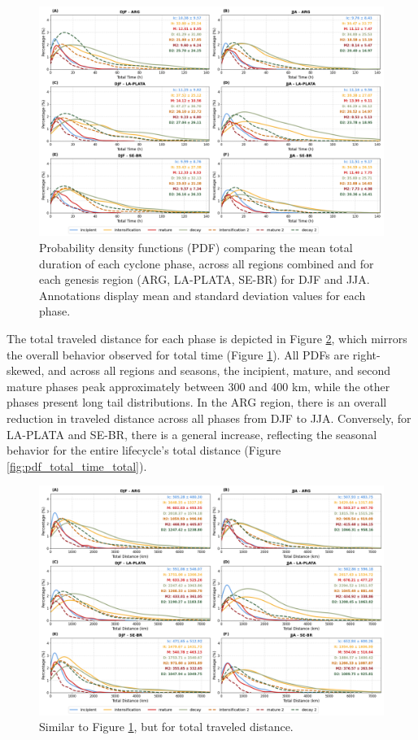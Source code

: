 \begin{figure}[h!]
\centering
\includegraphics[width=\textwidth]{figs_4/pdf_total_time.png}
\caption[PDF - Total Time]{Probability density functions (PDF) comparing the mean total duration of each cyclone phase, across all regions combined and for each genesis region (ARG, LA-PLATA, SE-BR) for DJF and JJA. Annotations display mean and standard deviation values for each phase.}
\label{fig:pdf_total_time}
\end{figure}

The total traveled distance for each phase is depicted in Figure \ref{fig:pdf_total_distance}, which mirrors the overall behavior observed for total time (Figure \ref{fig:pdf_total_time}). All PDFs are right-skewed, and across all regions and seasons, the incipient, mature, and second mature phases peak approximately between 300 and 400 km, while the other phases present long tail distributions. In the ARG region, there is an overall reduction in traveled distance across all phases from DJF to JJA. Conversely, for LA-PLATA and SE-BR, there is a general increase, reflecting the seasonal behavior for the entire lifecycle's total distance (Figure \ref{fig:pdf_total_time_total}).

\begin{figure}[h!]
\centering
\includegraphics[width=\textwidth]{figs_4/pdf_total_distance.png}
\caption[PDF - Total Distance]{Similar to Figure \ref{fig:pdf_total_time}, but for total traveled distance.}
\label{fig:pdf_total_distance}
\end{figure}

